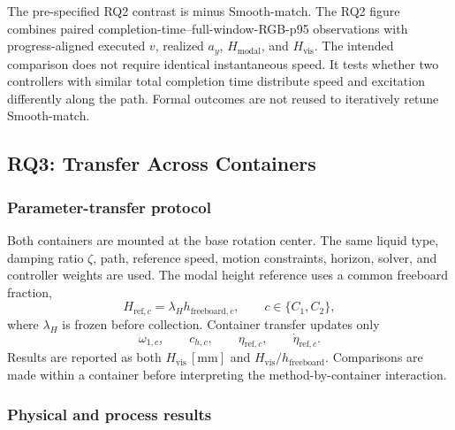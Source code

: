 The pre-specified RQ2 contrast is \SMPCC{} minus Smooth-match. The RQ2 figure
combines paired completion-time--full-window-RGB-p95 observations with
progress-aligned executed $v$, realized $a_y$, $H_{\mathrm{modal}}$, and
$H_{\mathrm{vis}}$. The intended comparison does not require identical
instantaneous speed. It tests whether two controllers with similar total
completion time distribute speed and excitation differently along the path.
Formal outcomes are not reused to iteratively retune Smooth-match.


\subsection{RQ3: Transfer Across Containers}

\subsubsection{Parameter-transfer protocol}

Both containers are mounted at the base rotation center. The same liquid type,
damping ratio $\zeta$, path, reference speed, motion constraints, horizon,
solver, and controller weights are used. The modal height reference uses a
common freeboard fraction,
\[
  H_{\mathrm{ref},c}
  =\lambda_H h_{\mathrm{freeboard},c},
  \qquad c\in\{C_1,C_2\},
\]
where $\lambda_H$ is frozen before collection. Container transfer updates only
\[
  \omega_{1,c},\qquad c_{h,c},\qquad
  \eta_{\mathrm{ref},c},\qquad
  \dot\eta_{\mathrm{ref},c}.
\]
Results are reported as both $H_{\mathrm{vis}}\,[\mathrm{mm}]$ and
$H_{\mathrm{vis}}/h_{\mathrm{freeboard}}$. Comparisons are made within a
container before interpreting the method-by-container interaction.

\subsubsection{Physical and process results}

